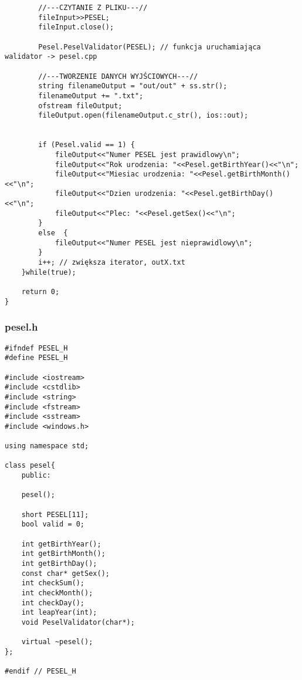 \documentclass[12pt,a4paper]{article}
\begin{document}
\begin{verbatim}
		//---CZYTANIE Z PLIKU---//
        fileInput>>PESEL;
        fileInput.close();

        Pesel.PeselValidator(PESEL); // funkcja uruchamiająca walidator -> pesel.cpp

		//---TWORZENIE DANYCH WYJŚCIOWYCH---//
        string filenameOutput = "out/out" + ss.str();
		filenameOutput += ".txt";
		ofstream fileOutput;
		fileOutput.open(filenameOutput.c_str(), ios::out);


        if (Pesel.valid == 1) {
            fileOutput<<"Numer PESEL jest prawidlowy\n";
            fileOutput<<"Rok urodzenia: "<<Pesel.getBirthYear()<<"\n";
            fileOutput<<"Miesiac urodzenia: "<<Pesel.getBirthMonth()<<"\n";
            fileOutput<<"Dzien urodzenia: "<<Pesel.getBirthDay()<<"\n";
            fileOutput<<"Plec: "<<Pesel.getSex()<<"\n";
        }
        else  {
            fileOutput<<"Numer PESEL jest nieprawidlowy\n";
        }
        i++; // zwiększa iterator, outX.txt
    }while(true);

    return 0;
}

	\end{verbatim}
	\subsubsection*{pesel.h}
	\begin{verbatim}
#ifndef PESEL_H
#define PESEL_H

#include <iostream>
#include <cstdlib>
#include <string>
#include <fstream>
#include <sstream>
#include <windows.h>

using namespace std;

class pesel{
    public:

    pesel();

    short PESEL[11];
    bool valid = 0;

    int getBirthYear();
    int getBirthMonth();
    int getBirthDay();
    const char* getSex();
    int checkSum();
    int checkMonth();
    int checkDay();
    int leapYear(int);
    void PeselValidator(char*);

    virtual ~pesel();
};

#endif // PESEL_H

	\end{verbatim}
	
\end{document}
